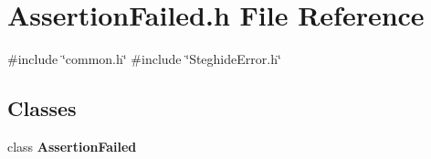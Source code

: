 \section{Assertion\+Failed.\+h File Reference}
\label{AssertionFailed_8h}
{\ttfamily \#include \char`\"{}common.\+h\char`\"{}}\newline
{\ttfamily \#include \char`\"{}Steghide\+Error.\+h\char`\"{}}\newline
\subsection*{Classes}
\begin{DoxyCompactItemize}
\item 
class \textbf{ Assertion\+Failed}
\end{DoxyCompactItemize}
